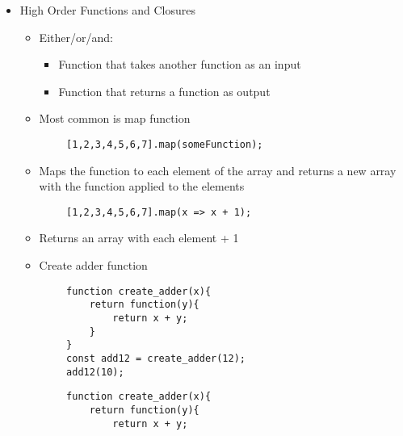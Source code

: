 \documentclass{article}
\begin{document}
\begin{itemize}
\begin{lstlisting}
                    let data3 = 3;
                    console.log(data1, data2, data3);
                }
            c();
            console.log(data1, data2);
            }
            b();
        }
        a();
    \end{lstlisting}
    \begin{itemize}
        \item You can access the ancestors variables
        \item Only works inner to outer
    \end{itemize}
    \item High Order Functions and Closures
    \begin{itemize}
        \item Either/or/and:
        \begin{itemize}
            \item Function that takes another function as an input
            \item Function that returns a function as output
        \end{itemize}
        \item Most common is map function
    \end{itemize}
    \begin{lstlisting}
        [1,2,3,4,5,6,7].map(someFunction);
    \end{lstlisting}
    \begin{itemize}
        \item Maps the function to each element of the array and returns a new array with the function applied to the elements
    \end{itemize}
    \begin{lstlisting}
        [1,2,3,4,5,6,7].map(x => x + 1);
    \end{lstlisting}
    \begin{itemize}
        \item Returns an array with each element + 1
        \item Create adder function
    \end{itemize}
    \begin{lstlisting}
        function create_adder(x){
            return function(y){
                return x + y;
            }
        }
        const add12 = create_adder(12);
        add12(10);
    \end{lstlisting}
    \begin{lstlisting}
        function create_adder(x){
            return function(y){
                return x + y;

\end{lstlisting}
\end{itemize}
\end{document}
